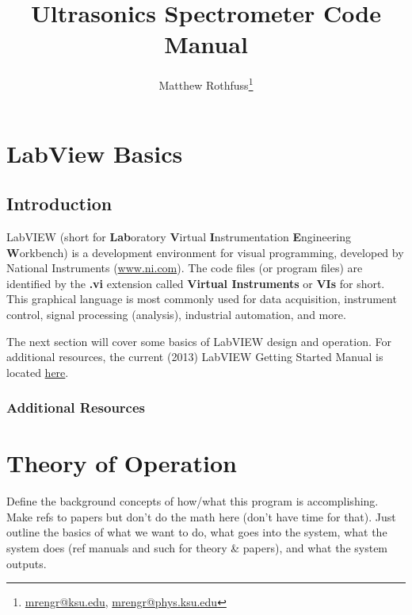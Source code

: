 \documentclass[11pt,a4paper,oldfontcommands]{memoir}
\begin{document}
\title{Ultrasonics Spectrometer Code Manual}
\author{Matthew Rothfuss\thanks{\href{mailto:mrengr@ksu.edu}{mrengr@ksu.edu}, \href{mailto:mrengr@phys.ksu.edu}{mrengr@phys.ksu.edu}}}

\maketitle
\newpage
\tableofcontents

\chapter{LabView Basics}

\section{Introduction}

LabVIEW	(short	for	\textbf{Lab}oratory	\textbf{V}irtual	\textbf{I}nstrumentation	\textbf{E}ngineering	\textbf{W}orkbench) is a development environment for visual programming, developed by National Instruments (\href{http://www.ni.com/}{www.ni.com}). The code files (or program files) are identified by the \textbf{.vi} extension called \textbf{Virtual Instruments} or \textbf{VIs} for short. This graphical language is most commonly used for data acquisition, instrument control, signal processing (analysis), industrial automation, and more.

The next section will cover some basics of LabVIEW design and operation. For additional resources, the current (2013) LabVIEW Getting Started Manual is located \href{http://www.ni.com/pdf/manuals/373427j.pdf}{here}.

\subsection{Additional Resources}

\cite{gomez_alvarez-arenas_air-coupled_2003}

\chapter{Theory of Operation}

Define the background concepts of how/what this program is accomplishing.  Make refs to papers but don't do the math here (don't have time for that).  Just outline the basics of what we want to do, what goes into the system, what the system does (ref manuals and such for theory \& papers), and what the system outputs.
\end{document}
